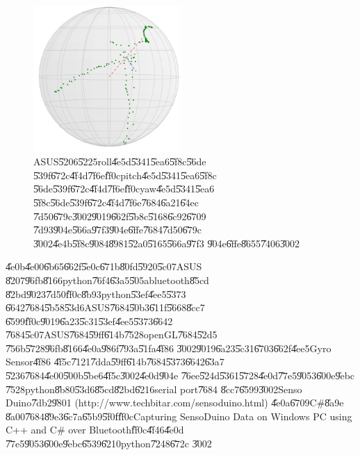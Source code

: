 \begin{figure}[th]
\caption{ASUS\U{5206}\U{5225}roll\U{4e5d}\U{5341}\U{5ea6}\U{5f8c}\U{56de}%
\U{539f}\U{672c}\U{4f4d}\U{7f6e}\U{ff0c}pitch\U{4e5d}\U{5341}\U{5ea6}\U{5f8c}%
\U{56de}\U{539f}\U{672c}\U{4f4d}\U{7f6e}\U{ff0c}yaw\U{4e5d}\U{5341}\U{5ea6}%
\U{5f8c}\U{56de}\U{539f}\U{672c}\U{4f4d}\U{7f6e}\U{7684}\U{6a21}\U{64ec}%
\U{7d50}\U{679c}\U{3002}\U{9019}\U{662f}\U{5b8c}\U{5168}\U{6c92}\U{6709}%
\U{7d93}\U{904e}\U{566a}\U{97f3}\U{904e}\U{6ffe}\U{7684}\U{7d50}\U{679c}%
\U{3002}\U{4e4b}\U{5f8c}\U{9084}\U{8981}\U{52a0}\U{5165}\U{566a}\U{97f3}%
\U{904e}\U{6ffe}\U{8655}\U{7406}\U{3002}}
\begin{center}
\includegraphics[width=0.5\textwidth]{./figs/ASUS_test.png}
\end{center}
\end{figure}

\U{4e0b}\U{4e00}\U{6b65}\U{662f}\U{5e0c}\U{671b}\U{80fd}\U{5920}\U{5c07}ASUS%
\U{8207}\U{96fb}\U{8166}python\U{76f4}\U{63a5}\U{505a}bluetooth\U{85cd}%
\U{82bd}\U{9023}\U{7d50}\U{ff0c}\U{8b93}python\U{53ef}\U{4ee5}\U{5373}%
\U{6642}\U{7684}\U{5b58}\U{53d6}ASUS\U{7684}\U{50b3}\U{611f}\U{5668}\U{8cc7}%
\U{6599}\U{ff0c}\U{9019}\U{6a23}\U{5c31}\U{53ef}\U{4ee5}\U{5373}\U{6642}%
\U{7684}\U{5c07}ASUS\U{7684}\U{59ff}\U{614b}\U{7528}openGL\U{7684}\U{52d5}%
\U{756b}\U{5728}\U{96fb}\U{8166}\U{4e0a}\U{986f}\U{793a}\U{51fa}\U{4f86}%
\U{3002}\U{9019}\U{6a23}\U{5c31}\U{6703}\U{662f}\U{4ee5}Gyro Sensor\U{4f86}%
\U{4f5c}\U{7121}\U{7dda}\U{59ff}\U{614b}\U{7684}\U{5373}\U{6642}\U{63a7}%
\U{5236}\U{7684}\U{4e00}\U{500b}\U{5be6}\U{4f5c}\U{3002}\U{4e0d}\U{904e}%
\U{76ee}\U{524d}\U{5361}\U{5728}\U{4e0d}\U{77e5}\U{9053}\U{600e}\U{9ebc}%
\U{7528}python\U{8b80}\U{53d6}\U{85cd}\U{82bd}\U{6216}serial port\U{7684}%
\U{8cc7}\U{6599}\U{3002}Senso Duino\U{7db2}\U{9801}
(http://www.techbitar.com/sensoduino.html) \U{4e0a}\U{6709}C\#\U{8a9e}%
\U{8a00}\U{7684}\U{89e3}\U{6c7a}\U{65b9}\U{5f0f}\U{ff0c}Capturing SensoDuino
Data on Windows PC using C++ and C\# over Bluetooth\U{ff0c}\U{4f46}\U{4e0d}%
\U{77e5}\U{9053}\U{600e}\U{9ebc}\U{6539}\U{6210}python\U{7248}\U{672c}%
\U{3002}

